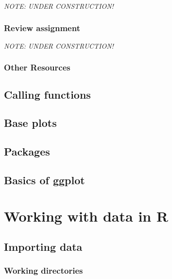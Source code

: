 \documentclass[
]{book}
\begin{document}
\emph{NOTE: UNDER CONSTRUCTION!}

\hypertarget{review-assignment-2}{%
\section*{Review assignment}\label{review-assignment-2}}

\emph{NOTE: UNDER CONSTRUCTION!}

\hypertarget{other-resources-3}{%
\section*{Other Resources}\label{other-resources-3}}

\hypertarget{calling-functions}{%
\chapter{Calling functions}\label{calling-functions}}

\hypertarget{base-plots}{%
\chapter{Base plots}\label{base-plots}}

\hypertarget{packages}{%
\chapter{Packages}\label{packages}}

\hypertarget{basics-of-ggplot}{%
\chapter{Basics of ggplot}\label{basics-of-ggplot}}

\hypertarget{part-working-with-data-in-r}{%
\part{Working with data in R}\label{part-working-with-data-in-r}}

\hypertarget{importing-data}{%
\chapter{Importing data}\label{importing-data}}

\hypertarget{working-directories}{%
\section{Working directories}\label{working-directories}}
\end{document}
